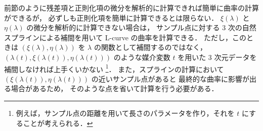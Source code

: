 前節のように残差項と正則化項の微分を解析的に計算できれば簡単に曲率の計算ができるが，
必ずしも正則化項を簡単に計算できるとは限らない．
$\xi(\lambda)$ と $\eta(\lambda)$
の微分を解析的に計算できない場合は，
サンプル点に対する 3 次の自然スプラインによる補間を用いて L-curve の曲率を計算できる．
ただし，このときは $(\xi(\lambda),\eta(\lambda))$ を
$\lambda$ の関数として補間するのではなく，
$(\lambda(t), \xi(\lambda(t)), \eta(\lambda(t)))$
のような媒介変数 $t$ を用いた
3 次元データを補間しなければ上手くいかない
\cite{Hansen1998,Hansen1993}
\footnote{例えば，サンプル点の距離を用いて長さのパラメータを作り，それを $t$ にすることが考えられる．}．
また，スプラインの計算において
$(\xi(\lambda(t)), \eta(\lambda(t)))$
の近いサンプル点があると
最終的な曲率に影響が出る場合があるため，
そのような点を省いて計算を行う必要がある．
